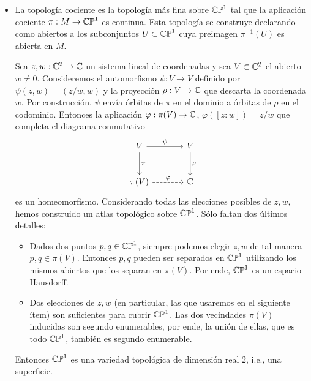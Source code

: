 \begin{solution}
\leavevmode
\begin{itemize}
    \item La topología cociente es la topología más fina sobre $\mathbb {CP}^1$ tal que la aplicación cociente $\pi : M \to \mathbb {CP}^1$ es continua. Esta topología se construye declarando como abiertos a los subconjuntos $U \subset \mathbb {CP}^1$ cuya preimagen $\pi^{-1}(U)$ es abierta en $M$.
    
    Sea $z, w : \mathbb C^2 \to \mathbb C$ un sistema lineal de coordenadas y sea $V \subset \mathbb C^2$ el abierto $w \ne 0$. Consideremos el automorfismo $\psi : V \to V$ definido por $\psi(z, w) = (z/w, w)$ y la proyección $\rho : V \to \mathbb C$ que descarta la coordenada $w$. Por construcción, $\psi$ envía órbitas de $\pi$ en el dominio a órbitas de $\rho$ en el codominio. Entonces la aplicación $\varphi : \pi(V) \to \mathbb C$, $\varphi([z:w]) = z/w$ que completa el diagrama conmutativo
    $$
    \begin{tikzcd}[row sep=large, column sep=large]
        V \arrow[r, "\psi"] \arrow[d, "\pi"] & V \arrow[d, "\rho"] \\
        \pi(V) \arrow[r, dashed, "\varphi"] & \C
    \end{tikzcd}
    $$
    es un homeomorfismo. Considerando todas las elecciones posibles de $z, w$, hemos construido un atlas topológico sobre $\mathbb {CP}^1$. Sólo faltan dos últimos detalles:
    \begin{itemize}
        \item Dados dos puntos $p, q \in \mathbb {CP}^1$, siempre podemos elegir $z, w$ de tal manera $p, q \in \pi(V)$. Entonces $p, q$ pueden ser separados en $\mathbb {CP}^1$ utilizando los mismos abiertos que los separan en $\pi(V)$. Por ende, $\mathbb {CP}^1$ es un espacio Hausdorff.
        
        \item Dos elecciones de $z, w$ (en particular, las que usaremos en el siguiente ítem) son suficientes  para cubrir $\mathbb {CP}^1$. Las dos vecindades $\pi(V)$ inducidas son segundo enumerables, por ende, la unión de ellas, que es todo $\mathbb {CP}^1$, también es segundo enumerable.
    \end{itemize}
    
    Entonces $\mathbb {CP}^1$ es una variedad topológica de dimensión real $2$, i.e., una superficie.
    

\end{itemize}
\end{solution}
